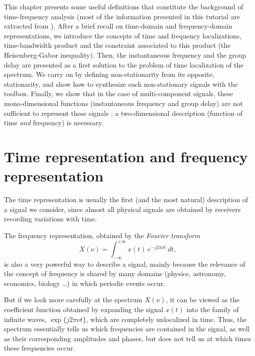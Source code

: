
  This chapter presents some useful definitions that constitute the
background of time-frequency analysis (most of the information presented in
this tutorial are extracted from \cite{FLA93}). After a brief recall on
time-domain and frequency-domain representations, we introduce the concepts
of time and frequency localizations, time-bandwidth product and the
constraint associated to this product (the Heisenberg-Gabor
inequality). Then, the instantaneous frequency and the group delay are
presented as a first solution to the problem of time localization of the
spectrum. We carry on by defining non-stationarity from its opposite,
stationarity, and show how to synthesize such non-stationary signals with
the toolbox. Finally, we show that in the case of multi-component signals,
these mono-dimensional functions (instantaneous frequency and group delay)
are not sufficient to represent these signals ; a two-dimensional
description (function of time {\em and} frequency) is necessary.


\section{Time representation and frequency representation}
  The time representation is usually the first (and the most natural)
description of a signal we consider, since almost all physical signals are
obtained by receivers recording variations with time.

  The frequency representation, obtained by the {\it Fourier transform}
\[X(\nu) = \int_{-\infty}^{+\infty} x(t)\ e^{-j2\pi \nu t}\ dt,\]
is also a very powerful way to describe a signal, mainly because the
relevance of the concept of frequency is shared by many domains (physics,
astronomy, economics, biology \ldots) in which periodic events occur.

  But if we look more carefully at the spectrum $X(\nu)$, it can be viewed
as the coefficient function obtained by expanding the signal $x(t)$ into
the family of infinite waves, $\exp\{j2\pi \nu t\}$, which are completely
unlocalized in time. Thus, the spectrum essentially tells us which
frequencies are contained in the signal, as well as their corresponding
amplitudes and phases, but does not tell us at which times these
frequencies occur.


